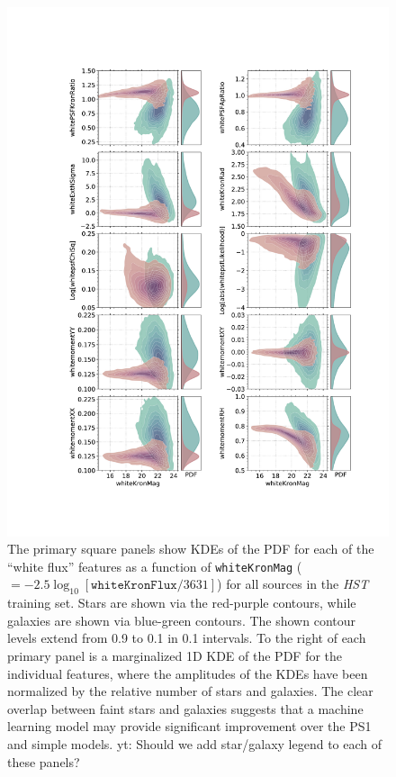 \documentclass[twocolumn]{aastex62}
\newcommand{\yutaro}[1]{{\color{red} yt: {#1}}}
\begin{document}
\begin{figure}[htb]
 \centering
  \includegraphics[width=5.75in
  ]{./Figures/whiteFeatures.pdf}
  \caption{
  The primary square panels show KDEs of the PDF for each of the ``white
  flux'' features as a function of \texttt{whiteKronMag}
  ($=-2.5\log_{10}[\mathtt{whiteKronFlux}/3631]$) for all sources in the
  \textit{HST} training set. Stars are shown via the red-purple contours,
  while galaxies are shown via blue-green contours. The shown contour levels
  extend from 0.9 to 0.1 in 0.1 intervals. To the right of each primary panel
  is a marginalized 1D KDE of the PDF for the individual features, where the
  amplitudes of the KDEs have been normalized by the relative number of stars
  and galaxies. The clear overlap between faint stars and galaxies suggests
  that a machine learning model may provide significant improvement over the
  PS1 and simple models.
  \yutaro{Should we add star/galaxy legend to each of these panels?}}
  \label{fig:features}
\end{figure}
\end{document}
